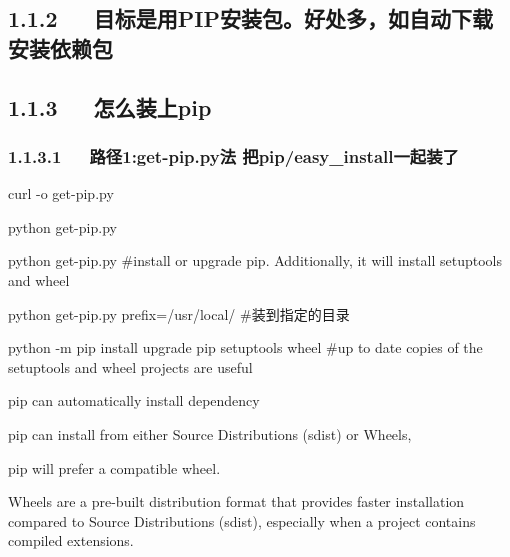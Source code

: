 \documentclass[letterpaper,12pt,english]{sphinxmanual}
\begin{document}
\subsection{1.1.2   目标是用PIP安装包。好处多，如自动下载安装依赖包}
\label{\detokenize{001software/001install/python:pip}}

\subsection{1.1.3   怎么装上pip}
\label{\detokenize{001software/001install/python:id3}}

\subsubsection{1.1.3.1   路径1:get-pip.py法 把pip/easy\_install一起装了}
\label{\detokenize{001software/001install/python:get-pip-py-pip-easy-install}}
\begin{DUlineblock}{0em}
\item[] 
\item[] curl  -o get-pip.py
\item[] python get-pip.py
\end{DUlineblock}

\begin{DUlineblock}{0em}
\item[] 
\item[] python get-pip.py \#install or upgrade pip. Additionally, it will
install setuptools and wheel
\item[] python get-pip.py \textendash{}prefix=/usr/local/ \#装到指定的目录
\item[] python -m pip install \textendash{}upgrade pip setuptools wheel \#up to date copies
of the setuptools and wheel projects are useful
\end{DUlineblock}

\begin{DUlineblock}{0em}
\item[] pip can automatically install dependency
\item[] pip can install from either Source Distributions (sdist) or Wheels,
\item[] pip will prefer a compatible wheel.
\item[] Wheels are a pre-built distribution format that provides faster
installation compared to Source Distributions (sdist), especially when
a project contains compiled extensions.
\end{DUlineblock}
\end{document}
